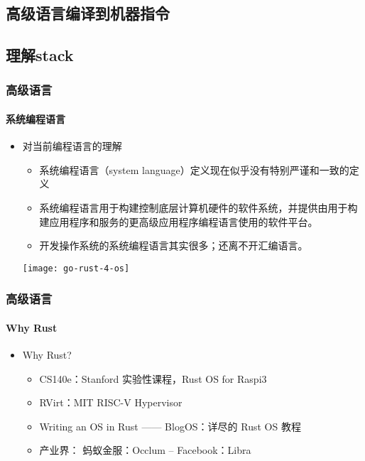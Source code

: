 \subsection{高级语言编译到机器指令} %
\subsection{理解stack}


\begin{frame}
	\frametitle{高级语言}
	\framesubtitle{系统编程语言}

\begin{itemize}
	
	\item 对当前编程语言的理解
	\begin{itemize}
		\item 系统编程语言（system language）定义现在似乎没有特别严谨和一致的定义
		\item 系统编程语言用于构建控制底层计算机硬件的软件系统，并提供由用于构建应用程序和服务的更高级应用程序编程语言使用的软件平台。
		\item 开发操作系统的系统编程语言其实很多；还离不开汇编语言。
	\end{itemize}
	\centering
	\texttt{[image: go-rust-4-os]}
\end{itemize}	
\end{frame}

\begin{frame}
	\frametitle{高级语言}
	\framesubtitle{Why Rust}
	
	\begin{itemize}
		
		\item Why Rust?
		\begin{itemize}
			\item CS140e：Stanford 实验性课程，Rust OS for Raspi3
			\item RVirt：MIT RISC-V Hypervisor
			\item Writing an OS in Rust —— BlogOS：详尽的 Rust OS 教程
			\item 产业界： 蚂蚁金服：Occlum  -- Facebook：Libra
		\end{itemize}

	\end{itemize}	
	
\end{frame}


